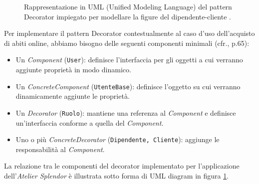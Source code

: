 \documentclass[12pt]{article}
\begin{document}
\begin{figure}[!t]
  \caption{\small Rappresentazione in UML (Unified Modeling Language) del pattern Decorator impiegato per modellare la figure del dipendente-cliente \cite{uml_riferimento}.}
  \label{fig:uml_diagram_decorator}
\end{figure}

Per implementare il pattern Decorator contestualmente al caso d'uso dell'acquisto di abiti online, abbiamo bisogno delle seguenti componenti minimali (cfr.\cite{gof_sunt}, p.65):
\begin{itemize}
    \item Un {\em Component} ({\tt User}): definisce l'interfaccia per gli oggetti a cui verranno aggiunte proprietà in modo dinamico.
    \item Un {\em ConcreteComponent} ({\tt UtenteBase}): definisce l'oggetto su cui verranno dinamicamente aggiunte le proprietà.
    \item Un {\em Decorator} ({\tt Ruolo}): mantiene una referenza al {\em Component} e definisce un'interfaccia conforme a quella del {\em Component}.
    \item Uno o più {\em ConcreteDecorator} ({\tt Dipendente, Cliente}): aggiunge le responsabilità al {\em Component}.
\end{itemize}
La relazione tra le componenti del decorator implementato per l'applicazione dell'{\em Atelier Splendor} è illustrata sotto forma di UML diagram in figura \ref{fig:uml_diagram_decorator}.
\end{document}
